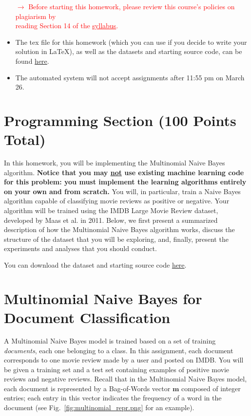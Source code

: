 \documentclass[letterpaper]{article}
\begin{document}
\begin{itemize}
    \begin{center}
        \textcolor{red}{$\rightarrow$ Before starting this homework, please review this course's policies on plagiarism by  \\reading Section 14 of the \href{https://people.cs.umass.edu/~bsilva/courses/CMPSCI_589/Spring2023/S23_589_Syllabus.pdf\#page=4}{\textcolor{red}{\underline{syllabus}}}.}
    \end{center}
    \item The tex file for this homework (which you can use if you decide to write your solution in \LaTeX), as well as the datasets and starting source code, can be found \href{https://people.cs.umass.edu/~bsilva/courses/CMPSCI_589/Spring2023/homeworks/hw2.zip}{here}.
    \item The automated system will not accept assignments after 11:55 pm on March 26. 
\end{itemize}

\newpage

\vspace{1cm}
\section*{Programming Section (100 Points Total)}

In this homework, you will be implementing the Multinomial Naive Bayes algorithm. \textbf{Notice that you may \ul{not} use existing machine learning code for this problem: you must implement the learning algorithms entirely on your own and from scratch.} 
%
You will, in particular, train a Naive Bayes algorithm capable of classifying movie reviews as positive or negative. Your algorithm will be trained using the IMDB Large Movie Review dataset, developed by Maas et al. in 2011. Below, we first present a summarized description of how the Multinomial Naive Bayes algorithm works, discuss the structure of the dataset that you will be exploring, and, finally, present the experiments and analyses that you should conduct.

\noindent You can download the dataset and starting source code  \href{https://people.cs.umass.edu/~bsilva/courses/CMPSCI_589/Spring2023/homeworks/hw2.zip}{here}.

\section{Multinomial Naive Bayes for Document Classification}

A Multinomial Naive Bayes model is trained based on a set of training \textit{documents}, each one belonging to a class. In this assignment, each document corresponds to one movie review made by a user and posted on IMDB. You will be given a training set and a test set containing examples of positive movie reviews and negative reviews. Recall that in the Multinomial Naive Bayes model, each document is represented by a Bag-of-Words vector $\mathbf{m}$ composed of integer entries; each entry in this vector indicates the frequency of a word in the document (see Fig.~\ref{fig:multinomial_repr.png} for an example).
\end{document}
